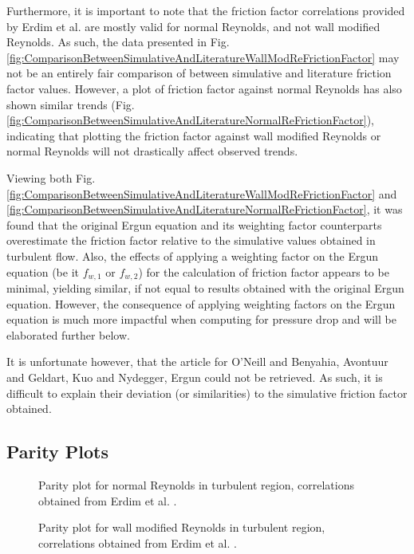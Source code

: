 Furthermore, it is important to note that the friction factor correlations provided by Erdim et al. \cite{Erdim2015} are mostly valid for normal Reynolds, and not wall modified Reynolds. As such, the data presented in Fig. \ref{fig:ComparisonBetweenSimulativeAndLiteratureWallModReFrictionFactor} may not be an entirely fair comparison of between simulative and literature friction factor values. However, a plot of friction factor against normal Reynolds has also shown similar trends (Fig. \ref{fig:ComparisonBetweenSimulativeAndLiteratureNormalReFrictionFactor}), indicating that plotting the friction factor against wall modified Reynolds or normal Reynolds will not drastically affect observed trends.

Viewing both Fig. \ref{fig:ComparisonBetweenSimulativeAndLiteratureWallModReFrictionFactor} and \ref{fig:ComparisonBetweenSimulativeAndLiteratureNormalReFrictionFactor}, it was found that the original Ergun equation and its weighting factor counterparts overestimate the friction factor relative to the simulative values obtained in turbulent flow. Also, the effects of applying a weighting factor on the Ergun equation (be it $f_{w,1}$ or $f_{w,2}$) for the calculation of friction factor appears to be minimal, yielding similar, if not equal to results obtained with the original Ergun equation. However, the consequence of applying weighting factors on the Ergun equation is much more impactful when computing for pressure drop and will be elaborated further below.

It is unfortunate however, that the article for O'Neill and Benyahia, Avontuur and Geldart, Kuo and Nydegger, Ergun could not be retrieved. As such, it is difficult to explain their deviation (or similarities) to the simulative friction factor obtained.
\subsection{Parity Plots}
\begin{figure} [H]
%
	\caption[Parity plot for normal Reynolds in turbulent region, correlations as displayed by Erdim et al.]{Parity plot for normal Reynolds in turbulent region, correlations obtained from Erdim et al. \cite{Erdim2015}.}%
	\label{fig:ParityPlotNormalReInTurbulentRegion}%
		
%
	\caption[Parity plot for wall modified Reynolds in turbulent region, correlations as displayed by Erdim et al.]{Parity plot for wall modified Reynolds in turbulent region, correlations obtained from Erdim et al. \cite{Erdim2015}.}%
	\label{fig:ParityPlotWallModReInTurbulentRegion}%
	
\end{figure}


